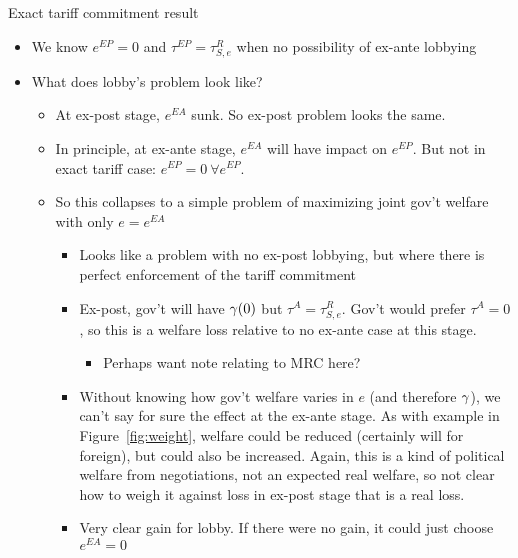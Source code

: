 \newpage
Exact tariff commitment result
\begin{itemize}
	\item We know $e^{EP} =0$ and $\tau^{EP} = \tau^R_{S,e}$ when no possibility of ex-ante lobbying
	\item What does lobby's problem look like?
		\begin{itemize}
			\item At ex-post stage, $e^{EA}$ sunk. So ex-post problem looks the same.
			\item In principle, at ex-ante stage, $e^{EA}$ will have impact on $e^{EP}$. But not in exact tariff case: $e^{EP} = 0 \ \forall e^{EP}$.
			\item So this collapses to a simple problem of maximizing joint gov't welfare with only $e=e^{EA}$
				\begin{itemize}
					\item Looks like a problem with no ex-post lobbying, but where there is perfect enforcement of the tariff commitment
					\item Ex-post, gov't will have $\gamma(0)$ but $\tau^A = \tau^R_{S,e}$. Gov't would prefer $\tau^A = 0$, so this is a welfare loss relative to no ex-ante case at this stage.
						\begin{itemize}
							\item Perhaps want note relating to MRC here?
						\end{itemize}
					\item Without knowing how gov't welfare varies in $e$ (and therefore $\gamma$), we can't say for sure the effect at the ex-ante stage. As with example in Figure~\ref{fig:weight}, welfare could be reduced (certainly will for foreign), but could also be increased. Again, this is a kind of political welfare from negotiations, not an expected real welfare, so not clear how to weigh it against loss in ex-post stage that is a real loss.
					\item Very clear gain for lobby. If there were no gain, it could just choose $e^{EA} = 0$
				\end{itemize}
		\end{itemize}
\end{itemize}

